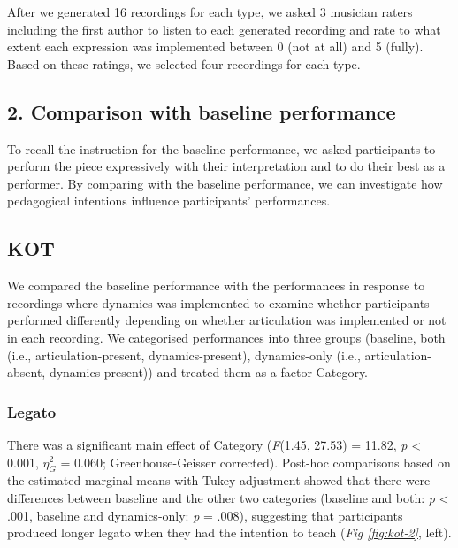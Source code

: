 \documentclass[
  man,floatsintext]{apa6}
\begin{document}
After we generated 16 recordings for each type, we asked 3 musician raters including the first author to listen to each generated recording and rate to what extent each expression was implemented between 0 (not at all) and 5 (fully). Based on these ratings, we selected four recordings for each type.

\hypertarget{comparison-with-baseline-performance}{%
\subsection{2. Comparison with baseline performance}\label{comparison-with-baseline-performance}}

To recall the instruction for the baseline performance, we asked participants to perform the piece expressively with their interpretation and to do their best as a performer. By comparing with the baseline performance, we can investigate how pedagogical intentions influence participants' performances.

\hypertarget{kot-1}{%
\subsection{KOT}\label{kot-1}}

We compared the baseline performance with the performances in response to recordings where dynamics was implemented to examine whether participants performed differently depending on whether articulation was implemented or not in each recording. We categorised performances into three groups (baseline, both (i.e., articulation-present, dynamics-present), dynamics-only (i.e., articulation-absent, dynamics-present)) and treated them as a factor Category.

\hypertarget{legato-1}{%
\subsubsection{Legato}\label{legato-1}}

There was a significant main effect of Category (\emph{F}(1.45, 27.53) = 11.82, \emph{p} \textless{} 0.001, \(\eta_G^2\) = 0.060; Greenhouse-Geisser corrected). Post-hoc comparisons based on the estimated marginal means with Tukey adjustment showed that there were differences between baseline and the other two categories (baseline and both: \emph{p} \textless{} .001, baseline and dynamics-only: \emph{p} = .008), suggesting that participants produced longer legato when they had the intention to teach (\emph{Fig \ref{fig:kot-2}}, left).
\end{document}

